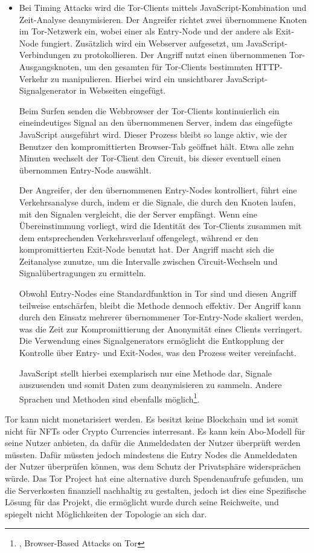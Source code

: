 \begin{itemize}
    \item Bei Timing Attacks wird die Tor-Clients mittels JavaScript-Kombination und Zeit-Analyse deanymisieren. Der Angreifer richtet zwei übernommene Knoten im Tor-Netzwerk ein, wobei einer als Entry-Node und der andere als Exit-Node fungiert. Zusätzlich wird ein Webserver aufgesetzt, um JavaScript-Verbindungen zu protokollieren. Der Angriff nutzt einen übernommenen Tor-Ausgangsknoten, um den gesamten für Tor-Clients bestimmten HTTP-Verkehr zu manipulieren. Hierbei wird ein unsichtbarer JavaScript-Signalgenerator in Webseiten eingefügt.

    Beim Surfen senden die Webbrowser der Tor-Clients kontinuierlich ein eineindeutiges Signal an den übernommenen Server, indem das eingefügte JavaScript ausgeführt wird. Dieser Prozess bleibt so lange aktiv, wie der Benutzer den kompromittierten Browser-Tab geöffnet hält. Etwa alle zehn Minuten wechselt der Tor-Client den Circuit, bis dieser eventuell einen übernommen Entry-Node auswählt.

    Der Angreifer, der den übernommenen Entry-Nodes kontrolliert, führt eine Verkehrsanalyse durch, indem er die Signale, die durch den Knoten laufen, mit den Signalen vergleicht, die der Server empfängt. Wenn eine Übereinstimmung vorliegt, wird die Identität des Tor-Clients zusammen mit dem entsprechenden Verkehrsverlauf offengelegt, während er den kompromittierten Exit-Node benutzt hat. Der Angriff macht sich die Zeitanalyse zunutze, um die Intervalle zwischen Circuit-Wechseln und Signalübertragungen zu ermitteln.

    Obwohl Entry-Nodes eine Standardfunktion in Tor sind und diesen Angriff teilweise entschärfen, bleibt die Methode dennoch effektiv. Der Angriff kann durch den Einsatz mehrerer übernommener Tor-Entry-Node skaliert werden, was die Zeit zur Kompromittierung der Anonymität eines Clients verringert. Die Verwendung eines Signalgenerators ermöglicht die Entkopplung der Kontrolle über Entry- und Exit-Nodes, was den Prozess weiter vereinfacht.

    JavaScript stellt hierbei exemplarisch nur eine Methode dar, Signale auszusenden und somit Daten zum deanymisieren zu sammeln. Andere Sprachen und Methoden sind ebenfalls möglich\footnote{\cite{BrowserBasedAttacksOnTor}, Browser-Based Attacks on Tor}.
\end{itemize}

Tor kann nicht monetarisiert werden. Es besitzt keine Blockchain und ist somit nicht für NFTs oder Crypto Currencies interresant. Es kann kein Abo-Modell für seine Nutzer anbieten, da dafür die Anmeldedaten der Nutzer überprüft werden müssten. Dafür müssten jedoch mindestens die Entry Nodes die Anmeldedaten der Nutzer überprüfen können, was dem Schutz der Privatsphäre widersprächen würde. Das Tor Project hat eine alternative durch Spendenaufrufe gefunden, um die Serverkosten finanziell nachhaltig zu gestalten, jedoch ist dies eine Spezifische Lösung für das Projekt, die ermöglicht wurde durch seine Reichweite, und spiegelt nicht Möglichkeiten der Topologie an sich dar.
